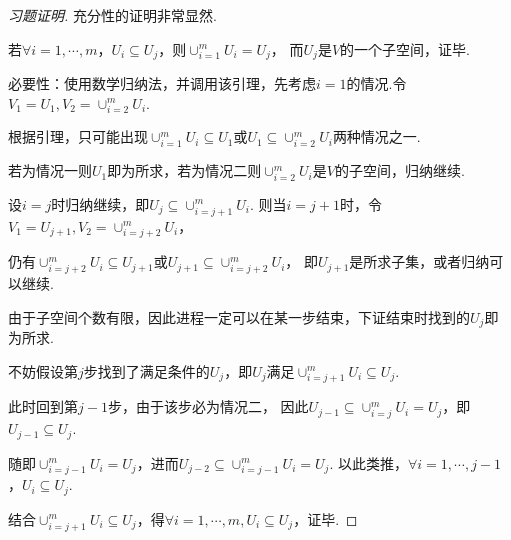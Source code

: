 \begin{proof}[习题证明]
    充分性的证明非常显然.

    若\(\forall i=1,\cdots,m\)，\(U_i \subseteq U_j\)，则\(\cup_{i=1}^m U_i=U_j\)，
    而\(U_j\)是\(V\)的一个子空间，证毕.

    必要性：使用数学归纳法，并调用该引理，先考虑\(i=1\)的情况.令\(V_1=U_1,V_2=\cup_{i=2}^m U_i\).

    根据引理，只可能出现\(\cup_{i=1}^m U_i \subseteq U_1\)或\(U_1 \subseteq \cup_{i=2}^m U_i\)两种情况之一.

    若为情况一则\(U_1\)即为所求，若为情况二则\(\cup_{i=2}^m U_i\)是\(V\)的子空间，归纳继续.

    设\(i=j\)时归纳继续，即\(U_j \subseteq \cup_{i=j+1}^m U_i\).
    则当\(i=j+1\)时，令\(V_1=U_{j+1},V_2=\cup_{i=j+2}^m U_i\)，

    仍有\(\cup_{i=j+2}^m U_i \subseteq U_{j+1}\)或\(U_{j+1} \subseteq \cup_{i=j+2}^m U_i\)，
    即\(U_{j+1}\)是所求子集，或者归纳可以继续.

    由于子空间个数有限，因此进程一定可以在某一步结束，下证结束时找到的\(U_j\)即为所求.

    不妨假设第\(j\)步找到了满足条件的\(U_j\)，即\(U_j\)满足\(\cup_{i=j+1}^m U_i\subseteq U_j\).

    此时回到第\(j-1\)步，由于该步必为情况二，
    因此\(U_{j-1} \subseteq \cup_{i=j}^m U_i=U_j\)，即\(U_{j-1} \subseteq U_j\).

    随即\(\cup_{i=j-1}^m U_i=U_j\)，进而\(U_{j-2} \subseteq \cup_{i=j-1}^m U_i=U_j\).
    以此类推，\(\forall i=1,\cdots,j-1\)，\(U_i\subseteq U_j\).

    结合\(\cup_{i=j+1}^m U_i \subseteq U_j\)，得\(\forall i=1,\cdots,m,U_i \subseteq U_j\)，证毕.
\end{proof}


